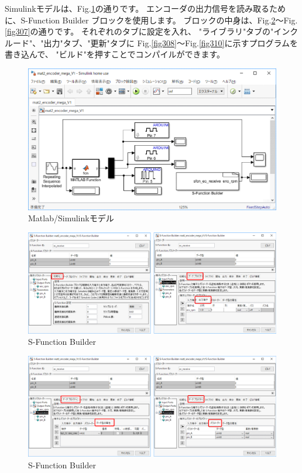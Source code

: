 Simulinkモデルは、Fig.\ref{fig303}の通りです。
エンコーダの出力信号を読み取るために、S-Function Builder ブロックを使用します。
ブロックの中身は、Fig.\ref{fig304}～Fig.\ref{fig307}の通りです。
それぞれのタブに設定を入れ、
"ライブラリ"タブの"インクルード"、"出力"タブ、"更新"タブに
Fig.\ref{fig308}～Fig.\ref{fig310}に示すプログラムを書き込んで、
"ビルド"を押すことでコンパイルができます。

\begin{figure}[htbp]
    \centering
    \includegraphics[width=380pt]{fig/fig303.eps}
    \caption{Matlab/Simulinkモデル}
    \label{fig303}
\end{figure}

\begin{figure}[htbp]
    \centering
    \includegraphics[width=380pt]{fig/fig304.eps}
    \caption{S-Function Builder}
    \label{fig304}
\end{figure}

\begin{figure}[htbp]
    \centering
    \includegraphics[width=380pt]{fig/fig305.eps}
    \caption{S-Function Builder}
    \label{fig305}
\end{figure}

